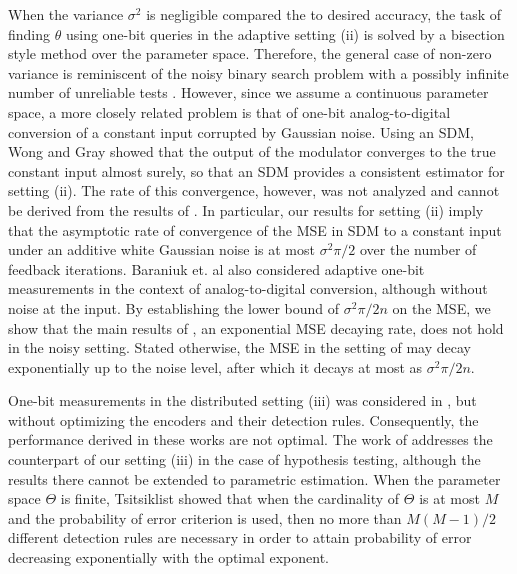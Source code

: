 When the variance $\sigma^2$ is negligible compared the to desired accuracy,
the task of finding $\theta$ using one-bit queries in the adaptive setting
(ii) is solved by a bisection style method over the parameter
space. Therefore, the general case of non-zero variance is reminiscent of
the noisy binary search problem with a possibly infinite number of
unreliable tests \cite{cicalese2002least,
  Karp:2007:NBS:1283383.1283478}. However, since we assume a continuous
parameter space, a more closely related problem is that of one-bit
analog-to-digital conversion of a constant input corrupted by Gaussian
noise. Using an SDM, Wong and Gray \cite{53738} showed that the output of
the modulator converges to the true constant input almost surely, so that an
SDM provides a consistent estimator for setting (ii). The rate of this
convergence, however, was not analyzed and cannot be derived from the
results of \cite{53738}. In particular, our results for setting (ii) imply
that the asymptotic rate of convergence of the MSE in SDM to a constant
input under an additive white Gaussian noise is at most $\sigma^2\pi/2$ over
the number of feedback iterations. Baraniuk et. al
\cite{baraniuk2017exponential} also considered adaptive one-bit measurements
in the context of analog-to-digital conversion, although without noise at
the input. By establishing the lower bound of $\sigma^2\pi/2n$ on the MSE,
we show that the main results of \cite{baraniuk2017exponential}, an
exponential MSE decaying rate, does not hold in the noisy setting. Stated
otherwise, the MSE in the setting of \cite{baraniuk2017exponential} may
decay exponentially up to the noise level, after which it decays at most as
$\sigma^2\pi/2n$. \par
%
One-bit measurements in the distributed setting (iii) was considered in \cite{904560,4244748, 6882252, chen2010performance, 5184907}, but without optimizing the encoders and their detection rules. Consequently, the performance derived in these works are not optimal. 
The work of \cite{52470} addresses the counterpart of our setting (iii) in the case of hypothesis testing, although the results there cannot be extended to parametric estimation. When the parameter space $\Theta$ is finite, Tsitsiklist \cite{tsitsiklis1988decentralized} showed that when the cardinality of $\Theta$ is at most $M$ and the probability of error criterion is used, then no more than $M(M-1)/2$ different detection rules are necessary in order to attain probability of error decreasing exponentially with the optimal exponent. %
